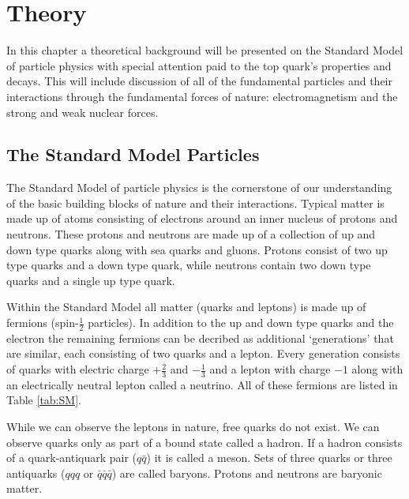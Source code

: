 
\chapter{Theory}
\label{ch:Theory}

In this chapter a theoretical background will be presented on the Standard Model of particle physics with special attention paid to the top quark's properties and decays.  This will include discussion of all of the fundamental particles and their interactions through the fundamental forces of nature: electromagnetism and the strong and weak nuclear forces.

\section{The Standard Model Particles}
\label{SMParticles}
The Standard Model of particle physics is the cornerstone of our understanding of the basic building blocks of nature and their interactions.  Typical matter is made up of atoms consisting of electrons around an inner nucleus of protons and neutrons.  These protons and neutrons are made up of a collection of up and down type quarks along with sea quarks and gluons.  Protons consist of two up type quarks and a down type quark, while neutrons contain two down type quarks and a single up type quark.  

Within the Standard Model all matter (quarks and leptons) is made up of fermions (spin-$\frac{1}{2}$ particles).  In addition to the up and down type quarks and the electron the remaining fermions can be decribed as additional `generations' that are similar, each consisting of two quarks and a lepton.  Every generation consists of quarks with electric charge $+\frac{2}{3}$ and $-\frac{1}{3}$ and a lepton with charge $-1$ along with an electrically neutral lepton called a neutrino.  All of these fermions are listed in Table \ref{tab:SM}.  

While we can observe the leptons in nature, free quarks do not exist.  We can observe quarks only as part of a bound state called a hadron.  If a hadron consists of a quark-antiquark pair ($q\bar{q}$) it is called a meson.  Sets of three quarks or three antiquarks ($qqq$ or $\bar{q}\bar{q}\bar{q}$) are called baryons.  Protons and neutrons are baryonic matter.


